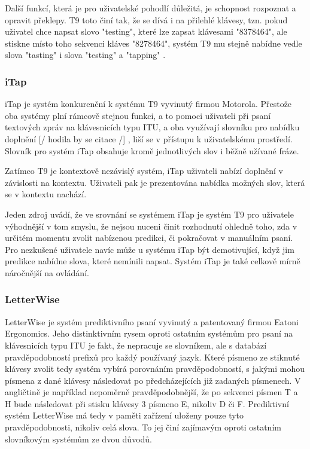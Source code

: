 \documentclass{article}
\begin{document}
Další funkcí, která je pro uživatelské pohodlí důležitá, je schopnost rozpoznat a opravit překlepy. T9 toto činí tak, že se dívá i na přilehlé klávesy, tzn. pokud uživatel chce napsat slovo "testing", které lze zapsat klávesami "8378464", ale stiskne místo toho sekvenci kláves "8278464", systém T9 mu stejně nabídne vedle slova "tasting" i slova "testing" a "tapping" \cite{hrzQ70bvKjUBgVml}.

\subsubsection{iTap}

iTap je systém konkurenční k systému T9 vyvinutý firmou Motorola. Přestože oba systémy plní rámcově stejnou funkci, a to pomoci uživateli při psaní textových zpráv na klávesnicích typu ITU, a oba využívají slovníku pro nabídku doplnění 
[/ hodila by se citace /]
, liší se v přístupu k uživatelskému prostředí. Slovník pro systém iTap obsahuje kromě jednotlivých slov i běžně užívané fráze.

Zatímco T9 je kontextově nezávislý systém, iTap uživateli nabízí doplnění v závislosti na kontextu. Uživateli pak je prezentována nabídka možných slov, která se v kontextu nachází. 

Jeden zdroj \cite{lBNMeL7t9XcnqSzq} uvádí, že ve srovnání se systémem iTap je systém T9 pro uživatele výhodnější v tom smyslu, že nejsou nuceni činit rozhodnutí ohledně toho, zda v určitém momentu zvolit nabízenou predikci, či pokračovat v manuálním psaní. Pro nezkušené uživatele navíc může u systému iTap být demotivující, když jim predikce nabídne slova, které nemínili napsat. Systém iTap je také celkově mírně náročnější na ovládání.

\subsubsection{LetterWise}

LetterWise je systém prediktivního psaní vyvinutý a patentovaný firmou Eatoni Ergonomics. Jeho distinktivním rysem oproti ostatním systémům pro psaní na klávesnicích typu ITU je fakt, že nepracuje se slovníkem, ale s databází pravděpodobností prefixů pro každý používaný jazyk. Které písmeno ze stiknuté klávesy zvolit tedy systém vybírá porovnáním pravděpodobností, s jakými mohou písmena z dané klávesy následovat po předcházejících již zadaných písmenech. V angličtině je například nepoměrně pravděpodobnější, že po sekvenci písmen T a H bude následovat při stisku klávesy 3 písmeno E, nikoliv D či F. Prediktivní systém LetterWise má tedy v paměti zařízení uloženy pouze tyto pravděpodobnosti, nikoliv celá slova. \cite{MacKenzie2001} To jej činí zajímavým oproti ostatním slovníkovým systémům ze dvou důvodů.
\end{document}

